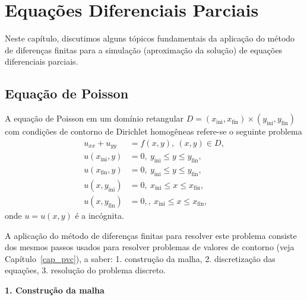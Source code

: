 
\chapter{Equações Diferenciais Parciais}\label{cap_edp}
\thispagestyle{fancy}

Neste capítulo, discutimos alguns tópicos fundamentais da aplicação do método de diferenças finitas para a simulação (aproximação da solução) de equações diferenciais parciais.

\section{Equação de Poisson}\label{cap_edp_sec_poisson}

A equação de Poisson em um domínio retangular $D = (x_{\text{ini}}, x_{\text{fin}})\times (y_{\text{ini}}, y_{\text{fin}})$ com condições de contorno de Dirichlet homogêneas refere-se o seguinte problema
\begin{align}
  u_{xx} + u_{yy} &= f(x, y),~(x, y)\in D, \label{eq:edp_Poisson_eq}\\
  u(x_{\text{ini}}, y) &= 0,~y_{\text{ini}}\leq y \leq y_{\text{fin}},\label{eq:edp_Poisson_bcxini}\\
  u(x_{\text{fin}}, y) &= 0,~y_{\text{ini}}\leq y \leq y_{\text{fin}},\label{eq:edp_Poisson_bcxfin}\\
  u(x, y_{\text{ini}}) &= 0,~x_{\text{ini}}\leq x \leq x_{\text{fin}},\label{eq:edp_Poisson_bcyini}\\
  u(x, y_{\text{fin}}) &= 0,,~x_{\text{ini}}\leq x \leq x_{\text{fin}},\label{eq:edp_Poisson_bcyfin}
\end{align}
onde $u = u(x,y)$ é a incógnita.

A aplicação do método de diferenças finitas para resolver este problema consiste dos mesmos passos usados para resolver problemas de valores de contorno (veja Capítulo~\ref{cap_pvc}), a saber: 1. construção da malha, 2. discretização das equações, 3. resolução do problema discreto.

\begin{flushleft}
  {\bf 1. Construção da malha}
\end{flushleft}


